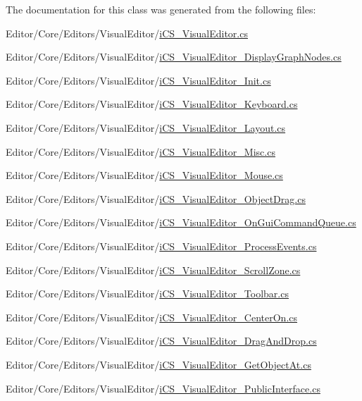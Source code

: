The documentation for this class was generated from the following files\+:\begin{DoxyCompactItemize}
\item 
Editor/\+Core/\+Editors/\+Visual\+Editor/\hyperlink{i_c_s___visual_editor_8cs}{i\+C\+S\+\_\+\+Visual\+Editor.\+cs}\item 
Editor/\+Core/\+Editors/\+Visual\+Editor/\hyperlink{i_c_s___visual_editor___display_graph_nodes_8cs}{i\+C\+S\+\_\+\+Visual\+Editor\+\_\+\+Display\+Graph\+Nodes.\+cs}\item 
Editor/\+Core/\+Editors/\+Visual\+Editor/\hyperlink{i_c_s___visual_editor___init_8cs}{i\+C\+S\+\_\+\+Visual\+Editor\+\_\+\+Init.\+cs}\item 
Editor/\+Core/\+Editors/\+Visual\+Editor/\hyperlink{i_c_s___visual_editor___keyboard_8cs}{i\+C\+S\+\_\+\+Visual\+Editor\+\_\+\+Keyboard.\+cs}\item 
Editor/\+Core/\+Editors/\+Visual\+Editor/\hyperlink{i_c_s___visual_editor___layout_8cs}{i\+C\+S\+\_\+\+Visual\+Editor\+\_\+\+Layout.\+cs}\item 
Editor/\+Core/\+Editors/\+Visual\+Editor/\hyperlink{i_c_s___visual_editor___misc_8cs}{i\+C\+S\+\_\+\+Visual\+Editor\+\_\+\+Misc.\+cs}\item 
Editor/\+Core/\+Editors/\+Visual\+Editor/\hyperlink{i_c_s___visual_editor___mouse_8cs}{i\+C\+S\+\_\+\+Visual\+Editor\+\_\+\+Mouse.\+cs}\item 
Editor/\+Core/\+Editors/\+Visual\+Editor/\hyperlink{i_c_s___visual_editor___object_drag_8cs}{i\+C\+S\+\_\+\+Visual\+Editor\+\_\+\+Object\+Drag.\+cs}\item 
Editor/\+Core/\+Editors/\+Visual\+Editor/\hyperlink{i_c_s___visual_editor___on_gui_command_queue_8cs}{i\+C\+S\+\_\+\+Visual\+Editor\+\_\+\+On\+Gui\+Command\+Queue.\+cs}\item 
Editor/\+Core/\+Editors/\+Visual\+Editor/\hyperlink{i_c_s___visual_editor___process_events_8cs}{i\+C\+S\+\_\+\+Visual\+Editor\+\_\+\+Process\+Events.\+cs}\item 
Editor/\+Core/\+Editors/\+Visual\+Editor/\hyperlink{i_c_s___visual_editor___scroll_zone_8cs}{i\+C\+S\+\_\+\+Visual\+Editor\+\_\+\+Scroll\+Zone.\+cs}\item 
Editor/\+Core/\+Editors/\+Visual\+Editor/\hyperlink{i_c_s___visual_editor___toolbar_8cs}{i\+C\+S\+\_\+\+Visual\+Editor\+\_\+\+Toolbar.\+cs}\item 
Editor/\+Core/\+Editors/\+Visual\+Editor/\hyperlink{i_c_s___visual_editor___center_on_8cs}{i\+C\+S\+\_\+\+Visual\+Editor\+\_\+\+Center\+On.\+cs}\item 
Editor/\+Core/\+Editors/\+Visual\+Editor/\hyperlink{i_c_s___visual_editor___drag_and_drop_8cs}{i\+C\+S\+\_\+\+Visual\+Editor\+\_\+\+Drag\+And\+Drop.\+cs}\item 
Editor/\+Core/\+Editors/\+Visual\+Editor/\hyperlink{i_c_s___visual_editor___get_object_at_8cs}{i\+C\+S\+\_\+\+Visual\+Editor\+\_\+\+Get\+Object\+At.\+cs}\item 
Editor/\+Core/\+Editors/\+Visual\+Editor/\hyperlink{i_c_s___visual_editor___public_interface_8cs}{i\+C\+S\+\_\+\+Visual\+Editor\+\_\+\+Public\+Interface.\+cs}\end{DoxyCompactItemize}
